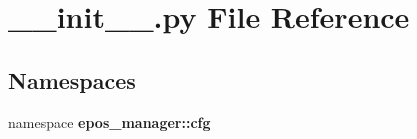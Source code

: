 \section{\-\_\-\-\_\-init\-\_\-\-\_\-.\-py \-File \-Reference}
\label{cfg_2____init_____8py}
\subsection*{\-Namespaces}
\begin{DoxyCompactItemize}
\item 
namespace {\bf epos\-\_\-manager\-::cfg}
\end{DoxyCompactItemize}
